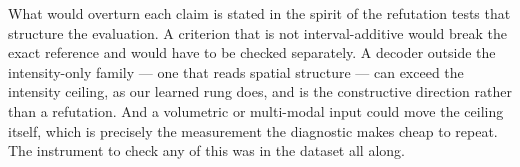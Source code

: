What would overturn each claim is stated in the spirit of the refutation tests
that structure the evaluation. A criterion that is not interval-additive would
break the exact reference and would have to be checked separately. A decoder
outside the intensity-only family --- one that reads spatial structure --- can
exceed the intensity ceiling, as our learned rung does, and is the constructive
direction rather than a refutation. And a volumetric or multi-modal input could
move the ceiling itself, which is precisely the measurement the diagnostic makes
cheap to repeat. The instrument to check any of this was in the dataset all
along.
